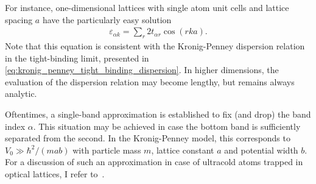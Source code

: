 For instance, one-dimensional lattices with single atom unit cells and lattice spacing $a$ have the particularly easy solution
\begin{align}
    \varepsilon_{\alpha k} = \sum_r 2t_{\alpha r}\cos(r ka).
    \label{eq:1D_tight_binding_dispersion}
\end{align}
Note that this equation is consistent with the Kronig-Penney dispersion relation in the tight-binding limit, presented in \cref{eq:kronig_penney_tight_binding_dispersion}.
In higher dimensions, the evaluation of the dispersion relation may become lengthy, but remains always analytic.

Oftentimes, a single-band approximation is established to fix (and drop) the band index $\alpha$.
This situation may be achieved in case the bottom band is sufficiently separated from the second.
In the Kronig-Penney model, this corresponds to $V_0\gg \hbar^2/(mab)$ with particle mass $m$, lattice constant $a$ and potential width $b$.
For a discussion of such an approximation in case of ultracold atoms trapped in optical lattices, I refer to~\cite{Buechler2010}.

